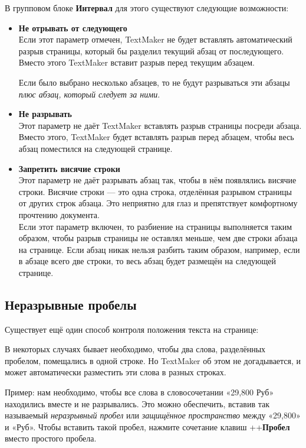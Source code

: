 \documentclass[a4paper,10pt]{article}
\begin{document}
В групповом блоке \textbf{Интервал} для этого существуют следующие возможности:
\begin{itemize}
 \item \textbf{Не отрывать от следующего}\\
 Если этот параметр отмечен, TextMaker не будет вставлять автоматический разрыв страницы, который бы разделил текущий абзац от последующего. Вместо этого TextMaker вставит разрыв перед текущим абзацем.
 
 Если было выбрано несколько абзацев, то не будут разрываться эти абзацы \textit{плюс абзац, который следует за ними}.
 \item \textbf{Не разрывать}\\
 Этот параметр не даёт TextMaker вставлять разрыв страницы посреди абзаца. Вместо этого, TextMaker будет вставлять разрыв перед абзацем, чтобы весь абзац поместился на следующей странице.
 \item \textbf{Запретить висячие строки}\\
 Этот параметр не даёт разрывать абзац так, чтобы в нём появлялись висячие строки. Висячие строки --- это одна строка, отделённая разрывом страницы от других строк абзаца. Это неприятно для глаз и препятствует комфортному прочтению документа.\\
 Если этот параметр включен, то разбиение на страницы выполняется таким образом, чтобы разрыв страницы не оставлял меньше, чем две строки абзаца на странице. Если абзац никак нельзя разбить таким образом, например, если в абзаце всего две строки, то весь абзац будет размещён на следующей странице.
\end{itemize}

\subsection{Неразрывные пробелы}
Существует ещё один способ контроля положения текста на странице:

В некоторых случаях бывает необходимо, чтобы два слова, разделённых пробелом, помещались в одной строке. Но TextMaker об этом не догадывается, и может автоматически разместить эти слова в разных строках. 

Пример: нам необходимо, чтобы все слова в словосочетании «29,800 Руб» находились вместе и не разрывались. Это можно обеспечить, вставив так называемый \textit{неразрывный пробел} или \textit{защищённое пространство} между «29,800» и «Руб». Чтобы вставить такой пробел, нажмите сочетание клавиш ++\textbf{Пробел} вместо простого пробела.
\end{document}
